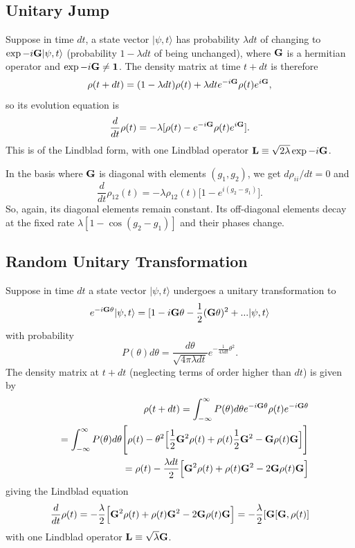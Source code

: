 \documentclass[aps,pra,amssymb, amsfonts,amsmath,showpacs, superscriptaddress,12pt]{revtex4}
\begin{document}
\subsection{Unitary Jump}

Suppose in time $dt$, a state vector $|\psi, t\rangle$ has probability $\lambda dt$ of changing to $\exp-i{\bf G}|\psi, t\rangle$ (probability $1-\lambda dt$ of being unchanged), where 
${\bf G}$ is a hermitian operator and $\exp-i{\bf G}\neq{\bf 1}$.  The density matrix at time $t+dt$ is therefore           
\[
	{\bf \rho}(t+dt)=(1-\lambda dt){\bf \rho}(t)+\lambda dte^{-i{\bf G}}{\bf \rho}(t)e^{i{\bf G}}, 
\]
\noindent so its evolution equation is  
\[
		\frac{d}{dt}{\bf \rho}(t)=-\lambda[{\bf \rho}(t)-e^{-i{\bf G}}{\bf \rho}(t)e^{i{\bf G}}].
\]
\noindent This is of the Lindblad form, with one Lindblad operator ${\bf L}\equiv  \sqrt{2\lambda}\exp{-i{\bf G}}$. 

In the basis where ${\bf G}$ is diagonal with elements $(g_{1},g_{2})$, we get 
$d\rho_{ii}/dt=0$ and
\[
\frac{d}{dt}\rho_{12}(t)=-\lambda\rho_{12}(t)\Big[1-e^{i(g_{2}-g_{1})}\Big]. 
\]
\noindent So, again, its diagonal elements remain constant.   Its off-diagonal elements  decay at the fixed rate $\lambda[1-\cos(g_{2}-g_{1})]$ 
and their phases change. 
 
\subsection{Random Unitary Transformation}
Suppose in time $dt$ a state vector $|\psi,t\rangle$ undergoes a unitary transformation to
\[ 
	e^{-i{\bf G}\theta}|\psi,t\rangle=[1-i{\bf G}\theta -\frac{1}{2}({\bf G}\theta)^{2}+ ...|\psi,t\rangle
\]
 with probability 
\[
P(\theta)d\theta = \frac{d\theta}{\sqrt{4\pi\lambda dt}}e^{-\frac{1}{4\lambda dt}\theta^{2}}. 
\] 
\noindent  The density matrix at $t+dt$ (neglecting terms of order higher than $dt$) is given by
\begin{eqnarray}
&&{\bf \rho}(t+dt)=\int_{-\infty}^{\infty}P(\theta)d\theta e^{-i{\bf G}\theta}{\bf \rho}(t)e^{-i{\bf G}\theta}\nonumber\\
&&=\int_{-\infty}^{\infty}P(\theta)d\theta\Bigg[{\bf \rho}(t)-\theta^{2}\Big[\frac{1}{2}{\bf G}^{2}{\bf \rho}(t)+{\bf \rho}(t)\frac{1}{2}{\bf G}^{2}-{\bf G}{\bf \rho}(t){\bf G}\Big]\Bigg]\nonumber\\
&&={\bf \rho}(t)-\frac{\lambda dt}{2}\Big[{\bf G}^{2}{\bf \rho}(t)+{\bf \rho}(t){\bf G}^{2}-2{\bf G}{\bf \rho}(t){\bf G}\Big]\nonumber
\end{eqnarray}
\noindent giving the Lindblad equation
\[
\frac{d}{dt}{\bf \rho}(t)=-\frac{\lambda}{2}\Big[{\bf G}^{2}{\bf \rho}(t)+{\bf \rho}(t){\bf G}^{2}-2{\bf G}{\bf \rho}(t){\bf G}\Big]=-\frac{\lambda}{2}[{\bf G}[{\bf G}, {\bf \rho}(t) ]
\]
\noindent with one Lindblad operator ${\bf L}\equiv \sqrt{\lambda} {\bf G}$.
\end{document}
